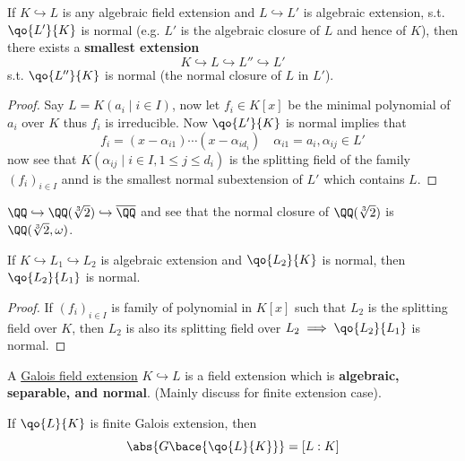\begin{proposition}
	If \( K \hookrightarrow L \) is any algebraic field extension and \( L \hookrightarrow L' \) is
	algebraic extension, s.t. \( \qo{L'}{K} \) is normal (e.g. \( L' \) is the algebraic closure of \(
	L\) and hence of \( K \)), then there exists a \textbf{smallest extension}
	\[
		K \hookrightarrow L \hookrightarrow L''\hookrightarrow L'
	\]
	s.t. \( \qo{L''}{K} \) is normal (the normal closure of \( L \) in \( L' \)).
\end{proposition}

\begin{proof}
	Say \( L = K(a_i \; | \; i \in I) \), now let \( f_i \in K[x] \) be the minimal polynomial of \( a_i \) over \( K \)
	thus \( f_i \) is irreducible. Now \( \qo{L'}{K} \) is normal implies that
	\[
		f_i = (x-\alpha_{i 1}) \cdots (x - \alpha_{i d_i}) \quad \alpha_{i 1} = a_i , \alpha_{ij} \in L'
	\]
	now see that \( K(\alpha_{ij} \; | \; i \in I, 1\leq j \leq d_i) \) is the splitting field of the
	family \( (f_i)_{i\in I} \) annd is the smallest normal subextension of \( L' \) which contains \(
	L\).
\end{proof}

\begin{eg}
	\( \QQ \hookrightarrow \QQ(\sqrt[3]{2}) \hookrightarrow \overline{\QQ} \) and see that the normal
	closure of \( \QQ(\sqrt[3]{2}) \) is \( \QQ(\sqrt[3]{2}, \omega) \).
\end{eg}

\begin{proposition}
	If \( K \hookrightarrow L_1 \hookrightarrow L_2 \) is algebraic extension and \( \qo{L_2}{K} \) is
	normal, then \( \qo{L_2}{L_1} \) is normal.
\end{proposition}

\begin{proof}
	If \( (f_i)_{i\in I} \) is family of polynomial in \( K[x] \) such that \( L_2 \) is the splitting
	field over \( K \), then \( L_2 \) is also its splitting field over \( L_2 \implies \qo{L_2}{L_1} \)
	is normal.
\end{proof}

\begin{definition}
	A \underline{Galois field extension} \( K \hookrightarrow L \) is a field extension which is
	\textbf{algebraic, separable, and normal}. (Mainly discuss for finite extension case).
\end{definition}

\begin{proposition}
	If \( \qo{L}{K} \) is finite Galois extension, then
	\[
		\abs{G\bace{\qo{L}{K}}} = [L:K]
	\]
\end{proposition}


